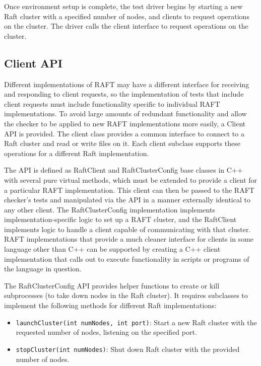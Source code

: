 \documentclass[UTF8]{article}
\begin{document}
Once environment setup is complete, the test driver begins by starting a new Raft cluster with a specified number of nodes, and clients to request operations on the cluster. The driver calls the client interface to request operations on the cluster.

\subsection{Client API}

Different implementations of RAFT may have a different interface for receiving and responding to client requests, so the implementation of tests that include client requests must include functionality specific to individual RAFT implementations. To avoid large amounts of redundant functionality and allow the checker to be applied to new RAFT implementations more easily, a Client API is provided. The client class provides a common interface to connect to a Raft cluster and read or write files on it. Each client subclass supports these operations for a different Raft implementation.

The API is defined as RaftClient and RaftClusterConfig base classes in C++ with several pure virtual methods, which must be extended to provide a client for a particular RAFT implementation. This client can then be passed to the RAFT checker's tests and manipulated via the API in a manner externally identical to any other client. The RaftClusterConfig implementation implements implementation-specific logic to set up a RAFT cluster, and the RaftClient implements logic to handle a client capable of communicating with that cluster. RAFT implementations that provide a much cleaner interface for clients in some language other than C++ can be supported by creating a C++ client implementation that calls out to execute functionality in scripts or programs of the language in question.

The RaftClusterConfig API provides helper functions to create or kill subprocesses (to take down nodes in the Raft cluster). It requires subclasses to implement the following methods for different Raft implementations:

\begin{itemize}
\item \texttt{launchCluster(int numNodes, int port)}: Start a new Raft cluster with the requested number of nodes, listening on the specified port.
\item \texttt{stopCluster(int numNodes)}: Shut down Raft cluster with the provided number of nodes.
\end{itemize}
\end{document}

